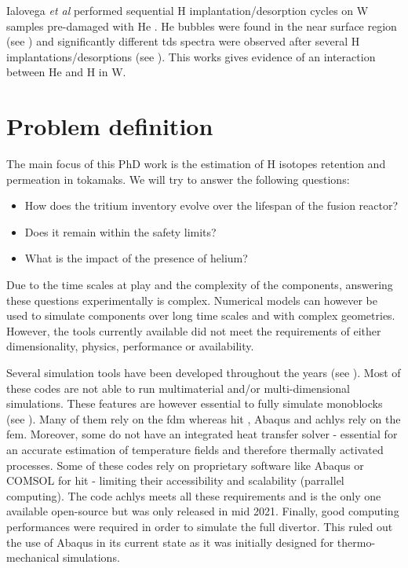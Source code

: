 Ialovega \textit{et al} performed sequential \gls{H} implantation/desorption cycles on W samples pre-damaged with He .
He bubbles were found in the near surface region (see ) and significantly different \gls{tds} spectra were observed after several \gls{H} implantations/desorptions (see ).
This works gives evidence of an interaction between He and \gls{H} in \gls{W}.

\section{Problem definition}

The main focus of this PhD work is the estimation of H \glspl{isotope} \gls{retention} and permeation in \glspl{tokamak}.
We will try to answer the following questions:
\begin{itemize}
    \item How does the tritium \gls{inventory} evolve over the lifespan of the fusion reactor?
    \item Does it remain within the safety limits?
    \item What is the impact of the presence of helium?
\end{itemize}

Due to the time scales at play and the complexity of the components, answering these questions experimentally is complex.
Numerical models can however be used to simulate components over long time scales and with complex geometries.
However, the tools currently available did not meet the requirements of either dimensionality, physics, performance or availability.

Several simulation tools have been developed throughout the years (see ).
Most of these codes are not able to run multimaterial and/or multi-dimensional simulations.
These features are however essential to fully simulate monoblocks (see ).
Many of them rely on the \gls{fdm} whereas \acrshort{hit} , Abaqus  and \gls{achlys}  rely on the \gls{fem}.
Moreover, some do not have an integrated heat transfer solver - essential for an accurate estimation of temperature fields and therefore thermally activated processes.
Some of these codes rely on proprietary software like Abaqus or COMSOL for \acrshort{hit} - limiting their accessibility and scalability (parrallel computing).
The code \gls{achlys} meets all these requirements and is the only one available open-source but was only released in mid 2021.
Finally, good computing performances were required in order to simulate the full \gls{divertor}.
This ruled out the use of Abaqus in its current state as it was initially designed for thermo-mechanical simulations.

